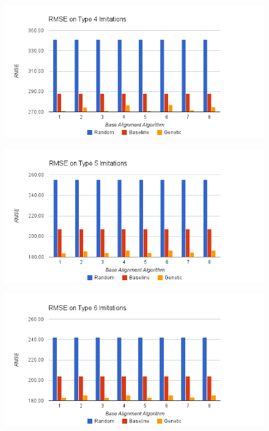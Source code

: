 \begin{figure}[center]
	\centering
	\includegraphics[width=16cm]{images/chart2.png}
	\caption{}
	\label{fig:c4}
\end{figure}
\begin{figure}[center]
	\centering
	\includegraphics[width=16cm]{images/chart7.png}
	\caption{}
	\label{fig:c5}
\end{figure}
\begin{figure}[center]
	\centering
	\includegraphics[width=16cm]{images/chart6.png}
	\caption{}
	\label{fig:c6}
\end{figure}
